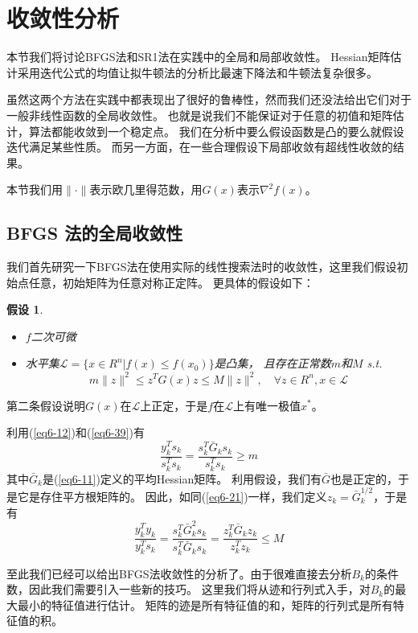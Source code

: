 \documentclass{article}
\newtheorem{asp}{假设}
\begin{document}
\section{收敛性分析}
本节我们将讨论BFGS法和SR1法在实践中的全局和局部收敛性。
Hessian矩阵估计采用迭代公式的均值让拟牛顿法的分析比最速下降法和牛顿法复杂很多。

虽然这两个方法在实践中都表现出了很好的鲁棒性，然而我们还没法给出它们对于一般非线性函数的全局收敛性。
也就是说我们不能保证对于任意的初值和矩阵估计，算法都能收敛到一个稳定点。
我们在分析中要么假设函数是凸的要么就假设迭代满足某些性质。
而另一方面，在一些合理假设下局部收敛有超线性收敛的结果。

本节我们用$\|\cdot\|$表示欧几里得范数，用$G(x)$表示$\nabla^2 f(x)$。
\subsection{BFGS 法的全局收敛性}我们首先研究一下BFGS法在使用实际的线性搜索法时的收敛性，这里我们假设初始点任意，初始矩阵为任意对称正定阵。
更具体的假设如下：
\begin{asp}
  \label{asp6-1}
  \begin{itemize}
    \item [(i)] $f$二次可微
    \item [(ii)] 水平集$\mathcal{L} = \{x\in R^n | f(x)\le f(x_0)\}$是凸集，
    且存在正常数$m$和$M$ s.t.
    \begin{equation}
      \label{eq6-39}
      m \|z\|^2 \le z^TG(x)z \le M\|z\|^2,\quad \forall z \in R^n,x\in \mathcal{L}
    \end{equation}
  \end{itemize}
\end{asp}
第二条假设说明$G(x)$在$\mathcal{L}$上正定，于是$f$在$\mathcal{L}$上有唯一极值$x^*$。

利用(\ref{eq6-12})和(\ref{eq6-39})有
\begin{equation}
  \label{eq6-40}
  \frac{y_k^Ts_k}{s_k^Ts_k} = \frac{s_k^T\bar{G}_k s_k}{s_k^Ts_k}\ge m
\end{equation}
其中$\bar{G}_k$是(\ref{eq6-11})定义的平均Hessian矩阵。
利用假设，我们有$\bar{G}$也是正定的，于是它是存住平方根矩阵的。
因此，如同(\ref{eq6-21})一样，我们定义$z_k = \bar{G}_k^{1/2}$，于是有
\begin{equation}
  \label{eq6-41}
  \frac{y_k^Ty_k}{y_k^Ts_k} = \frac{s_k^T\bar{G}_k^2s_k}{s_k^T\bar{G}_ks_k}
  = \frac{z_k^T\bar{G}_kz_k}{z_k^Tz_k} \le M
\end{equation}

至此我们已经可以给出BFGS法收敛性的分析了。由于很难直接去分析$B_k$的条件数，因此我们需要引入一些新的技巧。
这里我们将从迹和行列式入手，对$B_k$的最大最小的特征值进行估计。
矩阵的迹是所有特征值的和，矩阵的行列式是所有特征值的积。
\end{document}

